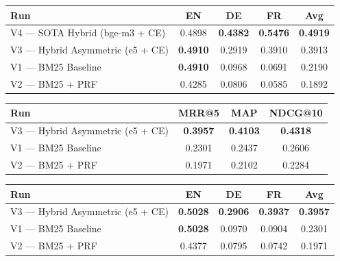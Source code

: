 \vspace{1em}
\noindent
\begin{minipage}{\linewidth}
\centering
{}
\label{tab:dev_lang}
\begin{tabularx}{\linewidth}{LCCCC}
\toprule
\textbf{Run} & \textbf{EN} & \textbf{DE} & \textbf{FR} & \textbf{Avg} \\
\midrule
V4 — SOTA Hybrid (bge-m3 + CE)   & 0.4898          & \textbf{0.4382}          & \textbf{0.5476} & \textbf{0.4919} \\
V3 — Hybrid Asymmetric (e5 + CE) & \textbf{0.4910} & 0.2919          & 0.3910          & 0.3913          \\
V1 — BM25 Baseline               & \textbf{0.4910} & 0.0968          & 0.0691          & 0.2190          \\
V2 — BM25 + PRF                  & 0.4285          & 0.0806          & 0.0585          & 0.1892          \\
\bottomrule
\end{tabularx}
\end{minipage}
\vspace{1em}

\vspace{1em}
\noindent
\begin{minipage}{\linewidth}
\centering
{}
\label{tab:train_macro}
\begin{tabularx}{\linewidth}{LCCC}
\toprule
\textbf{Run} & \textbf{MRR@5} & \textbf{MAP} & \textbf{NDCG@10} \\
\midrule
V3 — Hybrid Asymmetric (e5 + CE) & \textbf{0.3957} & \textbf{0.4103} & \textbf{0.4318} \\
V1 — BM25 Baseline               & 0.2301          & 0.2437          & 0.2606          \\
V2 — BM25 + PRF                  & 0.1971          & 0.2102          & 0.2284          \\
\bottomrule
\end{tabularx}
\end{minipage}
\vspace{1em}

\vspace{1em}
\noindent
\begin{minipage}{\linewidth}
\centering
{}
\label{tab:train_lang}
\begin{tabularx}{\linewidth}{LCCCC}
\toprule
\textbf{Run} & \textbf{EN} & \textbf{DE} & \textbf{FR} & \textbf{Avg} \\
\midrule
V3 — Hybrid Asymmetric (e5 + CE) & \textbf{0.5028} & \textbf{0.2906} & \textbf{0.3937} & \textbf{0.3957} \\
V1 — BM25 Baseline               & \textbf{0.5028} & 0.0970          & 0.0904          & 0.2301          \\
V2 — BM25 + PRF                  & 0.4377          & 0.0795          & 0.0742          & 0.1971          \\
\bottomrule
\end{tabularx}
\end{minipage}
\vspace{1em}
